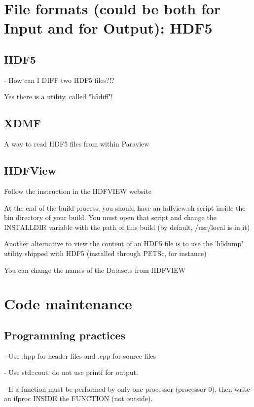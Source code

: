 \documentclass[10pt]{book}
\begin{document}
 \part{File formats (could be both for Input and for Output): HDF5}
 
 \chapter{HDF5} 
 
  - How can I DIFF two HDF5 files?!?

   Yes there is a utility, called "h5diff"! 
   

 \chapter{XDMF}
 
 A way to read HDF5 files from within Paraview

 \chapter{HDFView}
 
Follow the instruction in the HDFVIEW website

At the end of the build process, you should have an hdfview.sh script inside the bin directory of your build.
You must open that script and change the INSTALLDIR variable with the path of this build (by default, /usr/local is in it)

Another alternative to view the content of an HDF5 file is to use the 'h5dump' utility shipped with HDF5 (installed through PETSc, for instance)

You can change the names of the Datasets from HDFVIEW
   
 
\part{Code maintenance}

  \chapter{Programming practices}
  
- Use .hpp for header files and .cpp for source files

- Use std::cout, do not use printf for output.

- If a function must be performed by only one processor (processor 0),
then write an ifproc INSIDE the FUNCTION (not outside).
\end{document}
